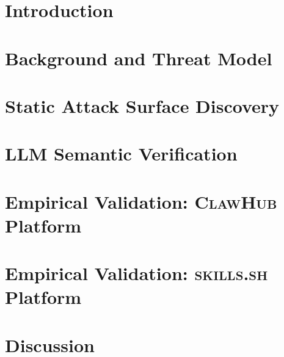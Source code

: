 \documentclass[letterpaper,twocolumn,10pt]{article}
\theoremstyle{definition}
\newcommand{\clawhub}{\textsc{ClawHub}\xspace}
\newcommand{\skillssh}{\textsc{skills.sh}\xspace}
\begin{document}
\section{Introduction}
\label{sec:intro}


\section{Background and Threat Model}
\label{sec:background}


\section{Static Attack Surface Discovery}
\label{sec:static}


\section{LLM Semantic Verification}
\label{sec:llm}


\section{Empirical Validation: \clawhub{} Platform}
\label{sec:eval_ch}


\section{Empirical Validation: \skillssh{} Platform}
\label{sec:eval_ss}


\section{Discussion}
\label{sec:discussion}

\end{document}
